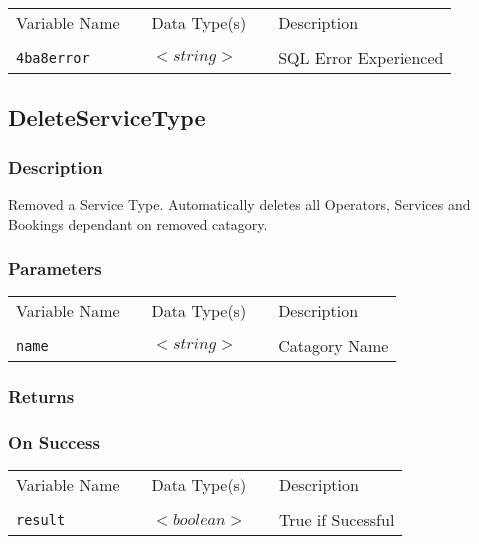 \begin{tabular}{lllll}
Variable Name	&		&	Data Type(s)		&	&	Description	\\
				&	&	&	&	\\
\verb!4ba8error! & \hspace{15mm} & $<string>$ & \hspace{15mm} & SQL Error Experienced \\
\end{tabular}


\subsection{DeleteServiceType}

\subsubsection{Description}

Removed a Service Type. Automatically deletes all Operators,
Services and Bookings dependant on removed catagory.

\subsubsection{Parameters}

\begin{tabular}{lllll}
Variable Name	&		&	Data Type(s)		&	&	Description	\\
				&	&	&	&	\\
\verb!name! & \hspace{15mm} & $<string>$ & \hspace{15mm} & Catagory Name \\
\end{tabular}

\subsubsection{Returns}

\subsubsection{On Success}

\begin{tabular}{lllll}
Variable Name	&		&	Data Type(s)		&	&	Description	\\
				&	&	&	&	\\
\verb!result! & \hspace{15mm} & $<boolean>$ & \hspace{15mm} & True if Sucessful \\
\end{tabular}

